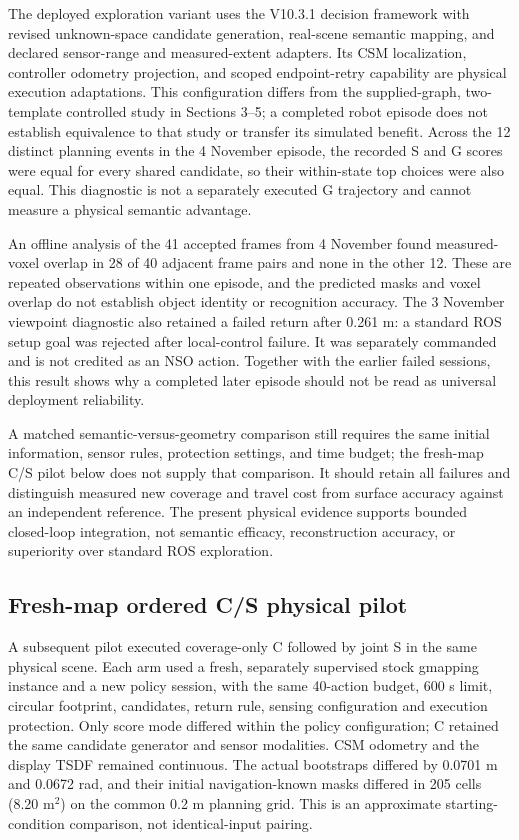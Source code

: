\documentclass[11pt,a4paper]{article}
\begin{document}
The deployed exploration variant uses the V10.3.1 decision framework with revised unknown-space candidate generation, real-scene semantic mapping, and declared sensor-range and measured-extent adapters. Its CSM localization, controller odometry projection, and scoped endpoint-retry capability are physical execution adaptations. This configuration differs from the supplied-graph, two-template controlled study in Sections 3--5; a completed robot episode does not establish equivalence to that study or transfer its simulated benefit. Across the 12 distinct planning events in the 4 November episode, the recorded S and G scores were equal for every shared candidate, so their within-state top choices were also equal. This diagnostic is not a separately executed G trajectory and cannot measure a physical semantic advantage.

An offline analysis of the 41 accepted frames from 4 November found measured-voxel overlap in 28 of 40 adjacent frame pairs and none in the other 12. These are repeated observations within one episode, and the predicted masks and voxel overlap do not establish object identity or recognition accuracy. The 3 November viewpoint diagnostic also retained a failed return after 0.261 m: a standard ROS setup goal was rejected after local-control failure. It was separately commanded and is not credited as an NSO action. Together with the earlier failed sessions, this result shows why a completed later episode should not be read as universal deployment reliability.

A matched semantic-versus-geometry comparison still requires the same initial information, sensor rules, protection settings, and time budget; the fresh-map C/S pilot below does not supply that comparison. It should retain all failures and distinguish measured new coverage and travel cost from surface accuracy against an independent reference. The present physical evidence supports bounded closed-loop integration, not semantic efficacy, reconstruction accuracy, or superiority over standard ROS exploration.

\subsection{Fresh-map ordered C/S physical pilot}

A subsequent pilot executed coverage-only C followed by joint S in the same physical scene. Each arm used a fresh, separately supervised stock gmapping instance and a new policy session, with the same 40-action budget, 600 s limit, circular footprint, candidates, return rule, sensing configuration and execution protection. Only score mode differed within the policy configuration; C retained the same candidate generator and sensor modalities. CSM odometry and the display TSDF remained continuous. The actual bootstraps differed by 0.0701 m and 0.0672 rad, and their initial navigation-known masks differed in 205 cells (8.20 m$^2$) on the common 0.2 m planning grid. This is an approximate starting-condition comparison, not identical-input pairing.
\end{document}
